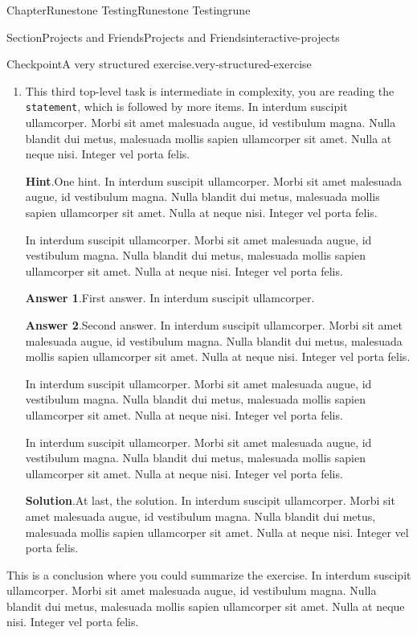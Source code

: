 \documentclass[oneside,10pt,]{book}
\newcommand{\blocktitlefont}{\relax}
\newcommand{\mono}[1]{\texttt{#1}}
\numberwithin{equation}{section}
\begin{document}
\begin{chapterptx}{Chapter}{Runestone Testing}{}{Runestone Testing}{}{}{rune}
\begin{sectionptx}{Section}{Projects and Friends}{}{Projects and Friends}{}{}{interactive-projects}
\begin{inlineexercise}{Checkpoint}{A very structured exercise.}{very-structured-exercise}
\begin{enumerate}[font=\bfseries,label=(\alph*),ref=\alph*]
\item{}This third top-level task is intermediate in complexity, you are reading the \mono{statement}, which is followed by more items. In interdum suscipit ullamcorper. Morbi sit amet malesuada augue, id vestibulum magna. Nulla blandit dui metus, malesuada mollis sapien ullamcorper sit amet. Nulla at neque nisi. Integer vel porta felis.%
\par\smallskip%
\noindent\textbf{\blocktitlefont Hint}.\hypertarget{very-structured-exercise-6-2}{}\quad{}One hint.  In interdum suscipit ullamcorper. Morbi sit amet malesuada augue, id vestibulum magna. Nulla blandit dui metus, malesuada mollis sapien ullamcorper sit amet. Nulla at neque nisi. Integer vel porta felis.%
\par
In interdum suscipit ullamcorper. Morbi sit amet malesuada augue, id vestibulum magna. Nulla blandit dui metus, malesuada mollis sapien ullamcorper sit amet. Nulla at neque nisi. Integer vel porta felis.%
\par\smallskip%
\noindent\textbf{\blocktitlefont Answer 1}.\hypertarget{very-structured-exercise-6-3}{}\quad{}First answer.  In interdum suscipit ullamcorper.%
\par\smallskip%
\noindent\textbf{\blocktitlefont Answer 2}.\hypertarget{very-structured-exercise-6-4}{}\quad{}Second answer.  In interdum suscipit ullamcorper. Morbi sit amet malesuada augue, id vestibulum magna. Nulla blandit dui metus, malesuada mollis sapien ullamcorper sit amet. Nulla at neque nisi. Integer vel porta felis.%
\par
In interdum suscipit ullamcorper. Morbi sit amet malesuada augue, id vestibulum magna. Nulla blandit dui metus, malesuada mollis sapien ullamcorper sit amet. Nulla at neque nisi. Integer vel porta felis.%
\par
In interdum suscipit ullamcorper. Morbi sit amet malesuada augue, id vestibulum magna. Nulla blandit dui metus, malesuada mollis sapien ullamcorper sit amet. Nulla at neque nisi. Integer vel porta felis.%
\par\smallskip%
\noindent\textbf{\blocktitlefont Solution}.\hypertarget{very-structured-exercise-6-5}{}\quad{}At last, the solution.  In interdum suscipit ullamcorper. Morbi sit amet malesuada augue, id vestibulum magna. Nulla blandit dui metus, malesuada mollis sapien ullamcorper sit amet. Nulla at neque nisi. Integer vel porta felis.%
\end{enumerate}%
This is a conclusion where you could summarize the exercise.  In interdum suscipit ullamcorper. Morbi sit amet malesuada augue, id vestibulum magna. Nulla blandit dui metus, malesuada mollis sapien ullamcorper sit amet. Nulla at neque nisi. Integer vel porta felis.%

\end{inlineexercise}
\end{sectionptx}
\end{chapterptx}
\end{document}
